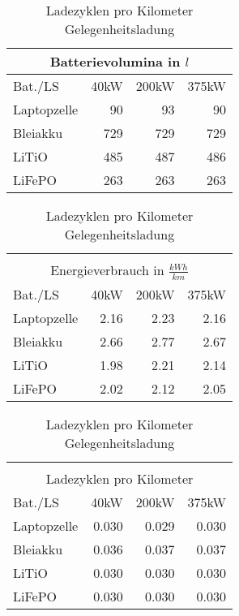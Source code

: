 \begin{table}[h!]
\begin{minipage}{0.45\textwidth}
	\end{minipage}\hfill
	\begin{minipage}{0.45\textwidth}
		\centering
		\begin{tabular}{lrrr}
			\multicolumn{4}{c}{Batterievolumina in $l$} \\ \toprule
			Bat./LS     & 40kW & 200kW &          375kW \\ \midrule
			Laptopzelle &   90 &    93 &             90 \\
			Bleiakku    &  729 &   729 &            729 \\
			LiTiO       &  485 &   487 &            486 \\
			LiFePO      &  263 &   263 &            263 \\ \bottomrule
		\end{tabular}
		\caption{Batterievolumina Nachtladung}
		
		\begin{tabular}{lrrr}
			 & & & \\
			\multicolumn{4}{c}{Energieverbrauch in $\frac{kWh}{km}$} \\ \toprule
			Bat./LS     & 40kW & 200kW &                       375kW \\ \midrule
			Laptopzelle & 2.16 &  2.23 &                        2.16 \\
			Bleiakku    & 2.66 &  2.77 &                        2.67 \\
			LiTiO       & 1.98 &  2.21 &                        2.14 \\
			LiFePO      & 2.02 &  2.12 &                        2.05 \\ \bottomrule
		\end{tabular} 
		\caption{Energieverbrauch Gelegenheitsladung}
		
		\begin{tabular}{lrrr}
			 & & & \\
			\multicolumn{4}{c}{Ladezyklen pro Kilometer} \\ \toprule
			Bat./LS     &  40kW & 200kW &          375kW \\ \midrule
			Laptopzelle & 0.030 & 0.029 &          0.030 \\
			Bleiakku    & 0.036 & 0.037 &          0.037 \\
			LiTiO       & 0.030 & 0.030 &          0.030 \\
			LiFePO      & 0.030 & 0.030 &          0.030 \\ \bottomrule
		\end{tabular} 
		\caption{Ladezyklen pro Kilometer Gelegenheitsladung}	
		
	\end{minipage}
	
	
\end{table}

